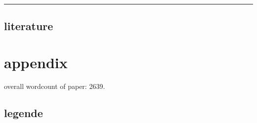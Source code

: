 \documentclass[
  12pt,
  oneside]{book}
\begin{document}
\begin{center}\rule{0.5\linewidth}{0.5pt}\end{center}

\section{literature}\label{literature}

\chapter{appendix}\label{appendix}

overall wordcount of paper: 2639.

\section{legende}\label{legende}
\end{document}
